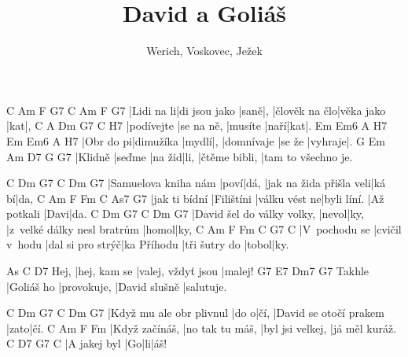 \documentclass{song}
\title{David a Goliáš}
\author{Werich, Voskovec, Ježek}
\begin{document}
\strophe
C          Am            F    G7 C             Am         F   G7
|Lidi na li|di jsou jako |saně|, |člověk na člo|věka jako |kat|,
C          A          Dm      G7   C   H7
|podívejte |se na ně, |musíte |naří|kat|.
Em        Em6       A     H7 Em         Em6    A       H7
|Obr do pi|dimužíka |mydlí|, |domnívaje |se že |vyhraje|.
G       Em     Am     D7   G             G7
|Klidně |seďme |na žid|li, |čtěme bibli, |tam to všechno je.
\endstrophe

\strophe
C                    Dm   G7   C                       Dm    G7
|Samuelova kniha nám |poví|dá, |jak na žida přišla veli|ká bí|da,
C             Am         F             Fm          C           As7  G7
|jak ti bídní |Filištíni |válku vést ne|byli líní. |Až potkali |Davi|da.
C                          Dm    G7   C                           Dm    G7
|David šel do války volky, |nevol|ky, |z~velké dálky nesl bratrům |homol|ky,
C             Am             F                Fm          C             G7    C
|V~pochodu se |cvičil v~hodu |dal si pro strýč|ka Příhodu |tři šutry do |tobol|ky.
\endstrophe

\strophe
     As           C                  D7
Hej, |hej, kam se |valej, vždyť jsou |malej!
       G7         E7          Dm7           G7
Takhle |Goliáš ho |provokuje, |David slušně |salutuje.
\endstrophe

\strophe
C                        Dm   G7   C                      Dm   G7
|Když mu ale obr plivnul |do o|čí, |David se otočí prakem |zato|čí.
C              Am              F                Fm
|Když začínáš, |no tak tu máš, |byl jsi velkej, |já měl kuráž.
C            D7 G7 C
|A jakej byl |Go|li|áš!
\endstrophe

\end{document}
